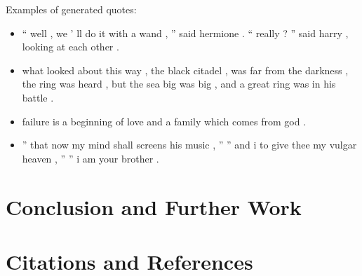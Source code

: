 \documentclass{article}
\newcommand{\compresslist}{
  \setlength{\itemsep}{1pt}
  \setlength{\parskip}{0pt}
  \setlength{\parsep}{0pt}}
\begin{document}
Examples of generated quotes:
\begin{itemize}\compresslist
    \item `` well , we ' ll do it with a wand , '' said hermione . `` really ?
      '' said harry , looking at each other .
    \item  what looked about this
      way , the black citadel , was far from the
          darkness , the ring was heard , but the sea big was big , and a great
          ring was in his battle .
    \item failure is a beginning of love and a family which comes from god .
    \item  '' that now my mind shall screens his music , '' '' and i to give
      thee my vulgar heaven , '' '' i am your brother .
\end{itemize}
\section{Conclusion and Further Work}
\section{Citations and References} 



\end{document}
